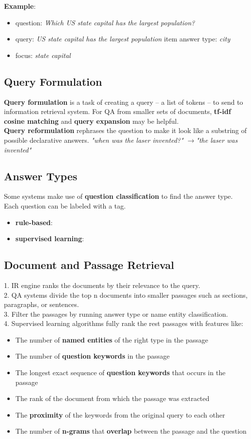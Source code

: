 \documentclass[a3paper, 12pt]{book} %
\begin{document}
\textbf{Example}:
\begin{itemize}
	\item question: \emph{Which US state capital has the largest population?}
	\item query: \emph{US state capital has the largest population}
	item answer type: \emph{city}
	\item focus: \emph{state capital}
\end{itemize}

\subsection{Query Formulation}
\textbf{Query formulation} is a task of creating a query -- a list of tokens -- to send to information retrieval system. For QA from smaller	sets of documents, \textbf{tf-idf cosine matching} and \textbf{query expansion} may be helpful. \\
\textbf{Query reformulation} rephrases the question to
make it look like a substring of possible declarative answers. \emph{"when was the laser invented?"} $\to$\emph{"the laser was invented"}

\subsection{Answer Types}
Some systems make use of \textbf{question classification} to find the answer type. Each question can be labeled with a tag.

\begin{itemize}
	\item \textbf{rule-based}:
	\item \textbf{supervised learning}:
\end{itemize}

\subsection{Document and Passage Retrieval}
1. IR engine ranks the documents by their relevance to the query. \\
2. QA systems divide the top n documents into smaller passages such
as sections, paragraphs, or sentences.\\
3. Filter the passages by running answer type or name entity classification. \\
4. Supervised learning algorithms fully rank the rest passages with features like:
\begin{itemize}
	\item The number of \textbf{named entities} of the right type in the passage
	\item The number of \textbf{question keywords} in the passage
	\item The longest exact sequence of \textbf{question keywords} that occurs in the passage
	\item The rank of the document from which the passage was extracted
	\item The \textbf{proximity} of the keywords from the original query to each other
	\item The number of \textbf{n-grams} that \textbf{overlap} between the passage and the question
\end{itemize} 
\end{document}

